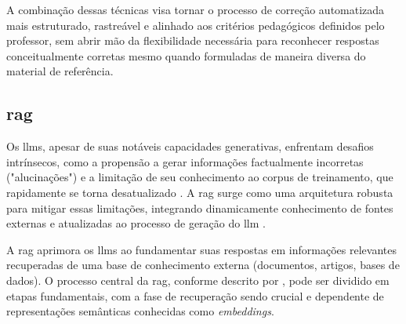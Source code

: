A combinação dessas técnicas visa tornar o processo de correção automatizada mais estruturado, rastreável e alinhado aos critérios pedagógicos definidos pelo professor, sem abrir mão da flexibilidade necessária para reconhecer respostas conceitualmente corretas mesmo quando formuladas de maneira diversa do material de referência.

\subsection{\texorpdfstring{\gls{rag}}{RAG}}

Os \gls{llm}s, apesar de suas notáveis capacidades generativas, enfrentam desafios intrínsecos, como a propensão a gerar informações factualmente incorretas ("alucinações") e a limitação de seu conhecimento ao corpus de treinamento, que rapidamente se torna desatualizado \cite{gao_retrieval-augmented_2024}. A \gls{rag} surge como uma arquitetura robusta para mitigar essas limitações, integrando dinamicamente conhecimento de fontes externas e atualizadas ao processo de geração do \gls{llm} \cite{lewis_retrieval-augmented_2021, gao_retrieval-augmented_2024}.

A \gls{rag} aprimora os \gls{llm}s ao fundamentar suas respostas em informações relevantes recuperadas de uma base de conhecimento externa (documentos, artigos, bases de dados). O processo central da \gls{rag}, conforme descrito por , pode ser dividido em etapas fundamentais, com a fase de recuperação sendo crucial e dependente de representações semânticas conhecidas como \textit{embeddings}.

